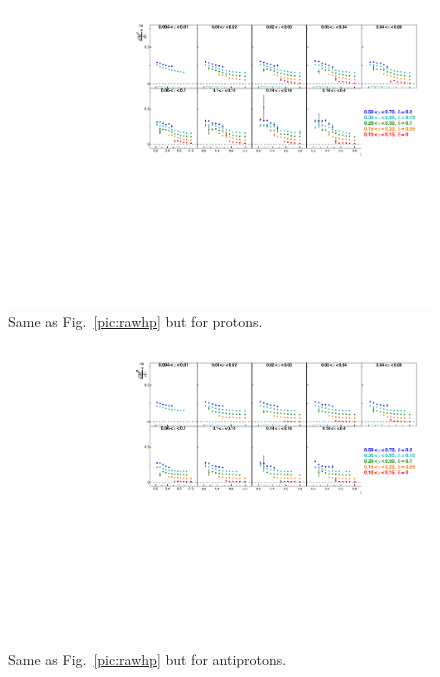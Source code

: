 \begin{figure}[!h]
  \includegraphics[scale=0.85]{./gfx/rawpp.pdf}
  \caption{Same as Fig.~\ref{pic:rawhp} but for protons.}
  \label{pic:rawpp}
\end{figure}

\begin{figure}[!h]
  \includegraphics[scale=0.85]{./gfx/rawpm.pdf}
  \caption{Same as Fig.~\ref{pic:rawhp} but for antiprotons.}
  \label{pic:rawpm}
\end{figure}
